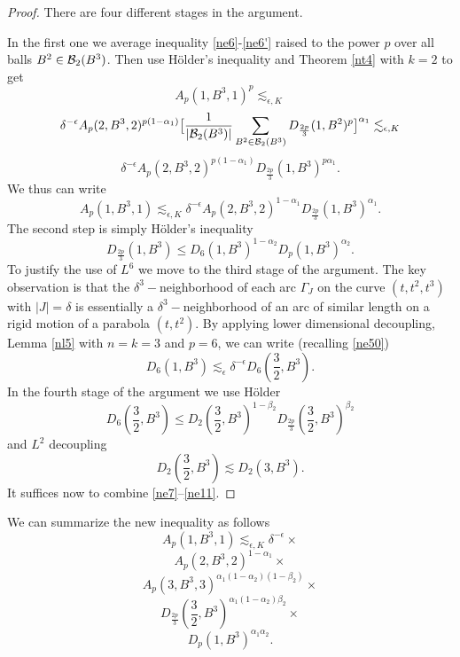 \documentclass[amssymb,amsfonts,12pt]{amsart}
\begin{document}
\begin{proof}
There are four different stages in the argument.
\medskip


In the first one we average inequality \eqref{ne6}-\eqref{ne6'} raised to the power $p$ over all balls $B^2\in{\mathcal B}_2(B^3)$. Then use H\"older's inequality and Theorem \ref{nt4} with $k=2$ to get
$$A_p(1,B^3,1)^p\lesssim_{\epsilon,K} $$$$\delta^{-\epsilon}A_p(2,B^3,2)^{p(1-\alpha_1)}\big[ \frac1{|{\mathcal B}_2(B^3)|}\sum_{B^2\in{\mathcal B}_2(B^3)}D_{\frac{2p}{3}}(1,B^2)^p\big]^{\alpha_1}\lesssim_{\epsilon,K}$$$$\delta^{-\epsilon}
A_p(2,B^3,2)^{p(1-\alpha_1)} D_{\frac{2p}{3}}(1,B^3)^{p\alpha_1}.$$
We thus can write
\begin{equation}
\label{ne7}
A_p(1,B^3,1)\lesssim_{\epsilon,K}\delta^{-\epsilon}A_p(2,B^3,2)^{1-\alpha_1} D_{\frac{2p}{3}}(1,B^3)^{\alpha_1}.
\end{equation}
The second step is simply H\"older's inequality
\begin{equation}
\label{ne8}
D_{\frac{2p}{3}}(1,B^3)\le D_6(1,B^3)^{1-\alpha_2}D_{p}(1,B^3)^{\alpha_2}.
\end{equation}
To justify the use of $L^6$ we move to the third stage of the argument. The key observation is that the $\delta^3-$neighborhood of each arc $\Gamma_J$ on the curve $(t,t^2,t^3)$ with $|J|=\delta$ is essentially a $\delta^3-$neighborhood of an arc of similar length on a rigid motion of a parabola $(t,t^2)$. By applying lower dimensional decoupling, Lemma \ref{nl5} with $n=k=3$ and $p=6$,  we can write (recalling \eqref{ne50})
\begin{equation}
\label{ne9}
D_6(1,B^3)\lesssim_\epsilon \delta^{-\epsilon}D_6(\frac32,B^3).\end{equation}
In the fourth stage of the argument we use H\"older
\begin{equation}
\label{ne10}
D_6(\frac32,B^3)\le D_2(\frac32,B^3)^{1-\beta_2}D_{\frac{2p}{3}}(\frac32,B^3)^{\beta_2}
\end{equation}
and $L^2$ decoupling
\begin{equation}
\label{ne11}
D_2(\frac32,B^3)\lesssim D_{2}(3,B^3).
\end{equation}
It suffices now to combine \eqref{ne7}--\eqref{ne11}.

\end{proof}
We can summarize the new inequality as follows
$$A_p(1,B^3,1)\lesssim_{\epsilon,K}\delta^{-\epsilon}\times$$
\begin{equation}\label{ne12}
A_p(2,B^3,2)^{1-\alpha_1}\times\end{equation}\begin{equation}
\label{ne14}A_p(3,B^3,3)^{\alpha_1(1-\alpha_2)(1-\beta_2)}\times\end{equation}\begin{equation}
\label{ne15}D_{\frac{2p}{3}}(\frac32,B^3)^{\alpha_1(1-\alpha_2)\beta_2}\times\end{equation}\begin{equation}
\label{ne16}D_p(1,B^3)^{\alpha_1\alpha_2}.
\end{equation}
\end{document}
